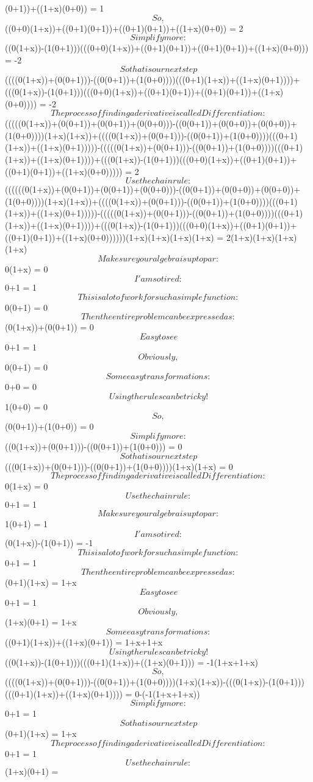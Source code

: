 \documentclass[12pt]{article}
\begin{document}
(0+1))+((1+x)\cdot (0+0)) = 1$$So, $$((0+0)\cdot (1+x))+((0+1)\cdot (0+1))+((0+1)\cdot (0+1))+((1+x)\cdot (0+0)) = 2$$Simplify more: $$((0\cdot (1+x))-(1\cdot (0+1)))\cdot (((0+0)\cdot (1+x))+((0+1)\cdot (0+1))+((0+1)\cdot (0+1))+((1+x)\cdot (0+0))) = -2$$So that is our next step$$((((0\cdot (1+x))+(0\cdot (0+1)))-((0\cdot (0+1))+(1\cdot (0+0))))\cdot (((0+1)\cdot (1+x))+((1+x)\cdot (0+1))))+(((0\cdot (1+x))-(1\cdot (0+1)))\cdot (((0+0)\cdot (1+x))+((0+1)\cdot (0+1))+((0+1)\cdot (0+1))+((1+x)\cdot (0+0)))) = -2$$The process of finding a derivative is called Differentiation: $$(((((0\cdot (1+x))+(0\cdot (0+1))+(0\cdot (0+1))+(0\cdot (0+0)))-((0\cdot (0+1))+(0\cdot (0+0))+(0\cdot (0+0))+(1\cdot (0+0))))\cdot (1+x)\cdot (1+x))+((((0\cdot (1+x))+(0\cdot (0+1)))-((0\cdot (0+1))+(1\cdot (0+0))))\cdot (((0+1)\cdot (1+x))+((1+x)\cdot (0+1)))))-(((((0\cdot (1+x))+(0\cdot (0+1)))-((0\cdot (0+1))+(1\cdot (0+0))))\cdot (((0+1)\cdot (1+x))+((1+x)\cdot (0+1))))+(((0\cdot (1+x))-(1\cdot (0+1)))\cdot (((0+0)\cdot (1+x))+((0+1)\cdot (0+1))+((0+1)\cdot (0+1))+((1+x)\cdot (0+0))))) = 2$$Use the chain rule: $$((((((0\cdot (1+x))+(0\cdot (0+1))+(0\cdot (0+1))+(0\cdot (0+0)))-((0\cdot (0+1))+(0\cdot (0+0))+(0\cdot (0+0))+(1\cdot (0+0))))\cdot (1+x)\cdot (1+x))+((((0\cdot (1+x))+(0\cdot (0+1)))-((0\cdot (0+1))+(1\cdot (0+0))))\cdot (((0+1)\cdot (1+x))+((1+x)\cdot (0+1)))))-(((((0\cdot (1+x))+(0\cdot (0+1)))-((0\cdot (0+1))+(1\cdot (0+0))))\cdot (((0+1)\cdot (1+x))+((1+x)\cdot (0+1))))+(((0\cdot (1+x))-(1\cdot (0+1)))\cdot (((0+0)\cdot (1+x))+((0+1)\cdot (0+1))+((0+1)\cdot (0+1))+((1+x)\cdot (0+0))))))\cdot (1+x)\cdot (1+x)\cdot (1+x)\cdot (1+x) = 2\cdot (1+x)\cdot (1+x)\cdot (1+x)\cdot (1+x)$$Make sure your algebra is up to par: $$0\cdot (1+x) = 0$$I'am so tired: $$0+1 = 1$$This is a lot of work for such a simple function: $$0\cdot (0+1) = 0$$Then the entire problem can be expressed as: $$(0\cdot (1+x))+(0\cdot (0+1)) = 0$$Easy to see$$0+1 = 1$$Obviously, $$0\cdot (0+1) = 0$$Some easy transformations: $$0+0 = 0$$Using the rules can be tricky!$$1\cdot (0+0) = 0$$So, $$(0\cdot (0+1))+(1\cdot (0+0)) = 0$$Simplify more: $$((0\cdot (1+x))+(0\cdot (0+1)))-((0\cdot (0+1))+(1\cdot (0+0))) = 0$$So that is our next step$$(((0\cdot (1+x))+(0\cdot (0+1)))-((0\cdot (0+1))+(1\cdot (0+0))))\cdot (1+x)\cdot (1+x) = 0$$The process of finding a derivative is called Differentiation: $$0\cdot (1+x) = 0$$Use the chain rule: $$0+1 = 1$$Make sure your algebra is up to par: $$1\cdot (0+1) = 1$$I'am so tired: $$(0\cdot (1+x))-(1\cdot (0+1)) = -1$$This is a lot of work for such a simple function: $$0+1 = 1$$Then the entire problem can be expressed as: $$(0+1)\cdot (1+x) = 1+x$$Easy to see$$0+1 = 1$$Obviously, $$(1+x)\cdot (0+1) = 1+x$$Some easy transformations: $$((0+1)\cdot (1+x))+((1+x)\cdot (0+1)) = 1+x+1+x$$Using the rules can be tricky!$$((0\cdot (1+x))-(1\cdot (0+1)))\cdot (((0+1)\cdot (1+x))+((1+x)\cdot (0+1))) = -1\cdot (1+x+1+x)$$So, $$((((0\cdot (1+x))+(0\cdot (0+1)))-((0\cdot (0+1))+(1\cdot (0+0))))\cdot (1+x)\cdot (1+x))-(((0\cdot (1+x))-(1\cdot (0+1)))\cdot (((0+1)\cdot (1+x))+((1+x)\cdot (0+1)))) = 0-(-1\cdot (1+x+1+x))$$Simplify more: $$0+1 = 1$$So that is our next step$$(0+1)\cdot (1+x) = 1+x$$The process of finding a derivative is called Differentiation: $$0+1 = 1$$Use the chain rule: $$(1+x)\cdot (0+1) = 
\end{document}
